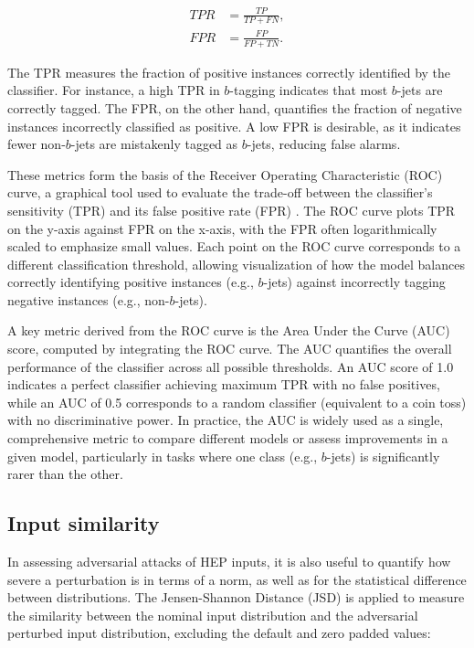 \begin{align}
    TPR &= \frac{TP}{TP + FN}, \\
    FPR &= \frac{FP}{FP + TN}.
\end{align}

The TPR measures the fraction of positive instances correctly identified by the classifier. For instance, a high TPR in $b$-tagging indicates that most $b$-jets are correctly tagged. The FPR, on the other hand, quantifies the fraction of negative instances incorrectly classified as positive. A low FPR is desirable, as it indicates fewer non-$b$-jets are mistakenly tagged as $b$-jets, reducing false alarms.

These metrics form the basis of the Receiver Operating Characteristic (ROC) curve, a graphical tool used to evaluate the trade-off between the classifier’s sensitivity (TPR) and its false positive rate (FPR) \cite{hoecker2009tmvatoolkitmultivariate}. The ROC curve plots TPR on the y-axis against FPR on the x-axis, with the FPR often logarithmically scaled to emphasize small values. Each point on the ROC curve corresponds to a different classification threshold, allowing visualization of how the model balances correctly identifying positive instances (e.g., $b$-jets) against incorrectly tagging negative instances (e.g., non-$b$-jets).

A key metric derived from the ROC curve is the Area Under the Curve (AUC) score, computed by integrating the ROC curve. The AUC quantifies the overall performance of the classifier across all possible thresholds. An AUC score of 1.0 indicates a perfect classifier achieving maximum TPR with no false positives, while an AUC of 0.5 corresponds to a random classifier (equivalent to a coin toss) with no discriminative power. In practice, the AUC is widely used as a single, comprehensive metric to compare different models or assess improvements in a given model, particularly in tasks where one class (e.g., $b$-jets) is significantly rarer than the other.

\subsection{Input similarity}
\label{sec:input_similarity}

In assessing adversarial attacks of HEP inputs, it is also useful to quantify how severe a perturbation is in terms of a norm, as well as for the statistical difference between distributions. The Jensen-Shannon Distance (JSD) is applied to measure the similarity between the nominal input distribution and the adversarial perturbed input distribution, excluding the default and zero padded values:

